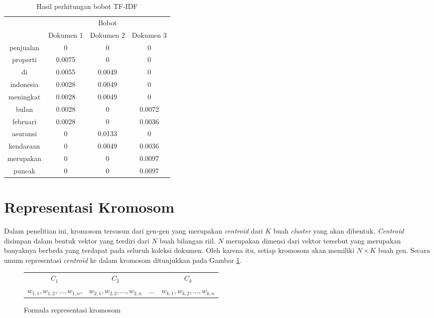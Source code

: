 \begin{table}[H]
	\centering
	\begin{tabular}{|c|c|c|c|} \hline
		\multirow{2}{*}{\Term} & \multicolumn{3}{c|}{Bobot} \\ \cline{2-4}
		& Dokumen 1 & Dokumen 2 & Dokumen 3 \\ \hline 
        penjualan & 0 & 0 & 0 \\ \hline
        properti & 0.0075 & 0 & 0 \\ \hline
        di & 0.0055 & 0.0049 & 0 \\ \hline
        indonesia & 0.0028 & 0.0049 & 0 \\ \hline
        meningkat & 0.0028 & 0.0049 & 0 \\ \hline
        bulan & 0.0028 & 0 & 0.0072 \\ \hline
        februari & 0.0028 & 0 & 0.0036 \\ \hline
        asuransi & 0 & 0.0133 & 0 \\ \hline
        kendaraan & 0 & 0.0049 & 0.0036 \\ \hline
        merupakan & 0 & 0 & 0.0097 \\ \hline
        puncak & 0 & 0 & 0.0097 \\ \hline
	\end{tabular}
	\caption{Hasil perhitungan bobot TF-IDF}
	\label{tbl:tf-idf}
\end{table}

\section{Representasi Kromosom}
\label{sec:chromosome-rep}
Dalam penelitian ini, kromosom tersusun dari gen-gen yang merupakan \textit{centroid} dari $K$ buah \textit{cluster} yang akan dibentuk. \textit{Centroid} disimpan dalam bentuk vektor yang terdiri dari $N$ buah bilangan riil. $N$ merupakan dimensi dari vektor tersebut yang merupakan banyaknya \term berbeda yang terdapat pada seluruh koleksi dokumen. Oleh karena itu, setiap kromosom akan memiliki $N\times K$ buah gen. Secara umum representasi \textit{centroid} ke dalam kromosom ditunjukkan pada Gambar \ref{fig:chromosome-rep}.

\begin{figure}[H]
	\centering
	\begin{tabular}{c c c c}
		$C_1$ & $C_2$ & & $C_k$ \\
		$w_{1,1}, w_{1,2}, ..., w_{1,n}$, & $w_{2,1}, w_{2,2}, ..., w_{2,n}$ & ... & $w_{k,1}, w_{k,2}, ..., w_{k,n}$
	\end{tabular}
	\caption{Formula representasi kromosom}
	\label{fig:chromosome-rep}
\end{figure}

